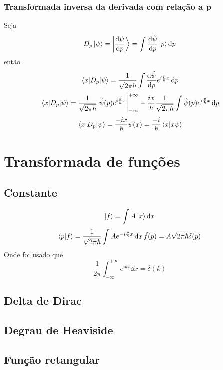 \documentclass[report,14pt,openright,oneside,a4paper,brazil]{abntex2}
\newcommand{\abrir}[2]{\int{#1}\ket{#2}\dd{#2}}
\newcommand{\qfourier}[1]{\frac{1}{\sqrt{2\pi\hbar}}\int{#1} e^{-i \frac{p}{\hbar} x} \dd{x}}
\newcommand{\aqfourier}[1]{\frac{1}{\sqrt{2\pi\hbar}}\int{#1} e^{i \frac{p}{\hbar} x} \dd{p}}
\begin{document}
\subsection{Transformada inversa da derivada com relação a p}

Seja
\begin{equation}
    D_p\ket{\psi}=\ket{\dv{\psi}{p}}= \abrir{\dv{\hat{\psi}}{p} (p)}{p}
\end{equation}
então
\begin{equation}
    \matrixel{x}{D_p}{\psi}= \aqfourier{\dv{\hat\psi}{p} (p)}
\end{equation}
\begin{equation}
    \matrixel{x}{D_p}{\psi}= \frac{1}{\sqrt{2\pi \hbar}}\eval{\hat\psi(p)e^{i\frac{p}{\hbar}x}}_{-\infty}^{+\infty}- \frac{ix}{\hbar} \aqfourier{\hat\psi(p)}
\end{equation}
\begin{equation}
    \matrixel{x}{D_p}{\psi}= \frac{-ix}{\hbar} \psi(x)=\frac{-i}{\hbar} \braket{x}{x\psi}
\end{equation}

\chapter{Transformada de funções}

\section{Constante}
\begin{equation}
    \ket{f}=\abrir{A}{x}
\end{equation}
\begin{equation}
        \braket{p}{f}=\qfourier{A}
        \hat{f}(p)=A\sqrt{2\pi\hbar}\delta (p)
\end{equation}
Onde foi usado que
\begin{equation}
    \frac{1}{2\pi} \int_{-\infty}^{+\infty}{e^{ikx}} \dd{x} = \delta (k)
\end{equation}

\section{Delta de Dirac}

\section{Degrau de Heaviside}

\section{Função retangular}
\end{document}
